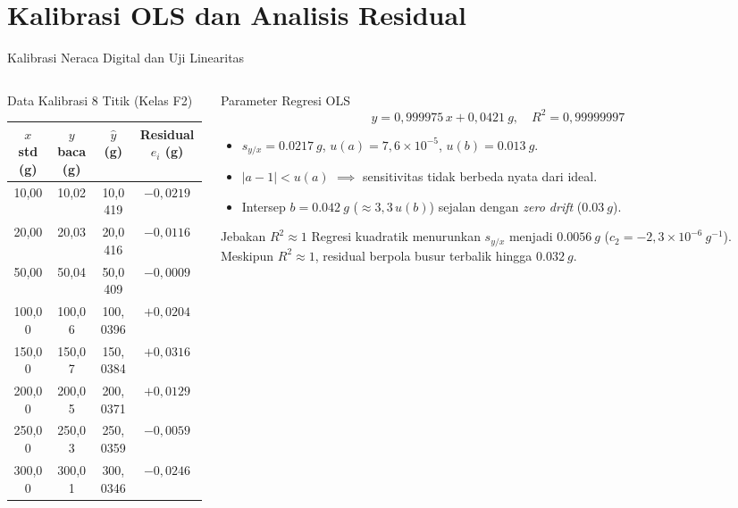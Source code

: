 \documentclass[aspectratio=169,10pt]{beamer}
\newcommand{\sm}{\fontsize{8.2}{10.2}\selectfont}
\newcommand{\xs}{\fontsize{7.1}{9}\selectfont}
\begin{document}
\section{Kalibrasi OLS dan Analisis Residual}

\begin{frame}{Kalibrasi Neraca Digital dan Uji Linearitas}
\begin{columns}[T,onlytextwidth]
\begin{column}{.48\textwidth}
\begin{block}{Data Kalibrasi 8 Titik (Kelas F2)}\xs
\centering
\begin{tabular}{@{}cccc@{}}
\toprule
$x$ \textbf{std (g)} & $y$ \textbf{baca (g)} & $\hat{y}$ \textbf{(g)} & \textbf{Residual $e_i$ (g)}\\
\midrule
10,00 & 10,02 & 10,0419 & $-0{,}0219$\\
20,00 & 20,03 & 20,0416 & $-0{,}0116$\\
50,00 & 50,04 & 50,0409 & $-0{,}0009$\\
100,00 & 100,06 & 100,0396 & $+0{,}0204$\\
150,00 & 150,07 & 150,0384 & $+0{,}0316$\\
200,00 & 200,05 & 200,0371 & $+0{,}0129$\\
250,00 & 250,03 & 250,0359 & $-0{,}0059$\\
300,00 & 300,01 & 300,0346 & $-0{,}0246$\\
\bottomrule
\end{tabular}
\end{block}
\end{column}

\begin{column}{.50\textwidth}
\begin{exampleblock}{Parameter Regresi OLS}\sm
$$\boxed{y = 0{,}999975\,x + 0{,}0421\ \si{g}, \quad R^2 = 0{,}99999997}$$
\begin{itemize}
\item $s_{y/x} = \SI{0,0217}{g}$, $u(a)=7{,}6\times 10^{-5}$, $u(b)=\SI{0,013}{g}$.
\item $|a-1| < u(a)$ $\implies$ sensitivitas tidak berbeda nyata dari ideal.
\item Intersep $b = \SI{0,042}{g}$ ($\approx 3{,}3\,u(b)$) sejalan dengan \textit{zero drift} ($\SI{0,03}{g}$).
\end{itemize}
\end{exampleblock}
\begin{alertblock}{Jebakan $R^2 \approx 1$}\xs
Regresi kuadratik menurunkan $s_{y/x}$ menjadi $\SI{0,0056}{g}$ ($c_2 = -2{,}3\times 10^{-6}\ \si{g^{-1}}$). Meskipun $R^2 \approx 1$, residual berpola busur terbalik hingga $\SI{0,032}{g}$.
\end{alertblock}
\end{column}
\end{columns}
\end{frame}
\end{document}

